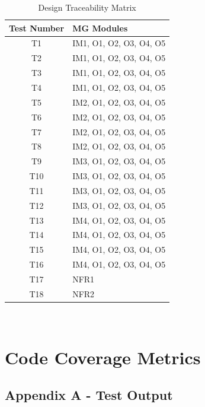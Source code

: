 \documentclass[12pt, titlepage]{article}
\begin{document}
\begin{table} [H]
  \caption{Design Traceability Matrix}
  \label{Table:Table_Traceability_MG}  
\begin{tabular}{|c|p{8cm}|}
  \hline	
  \textbf{Test Number} & \textbf{MG Modules}\\
  \hline 
   T1& IM1, O1, O2, O3, O4, O5\\ \hline
   T2& IM1, O1, O2, O3, O4, O5\\ \hline
   T3& IM1, O1, O2, O3, O4, O5\\ \hline
   T4& IM1, O1, O2, O3, O4, O5\\ \hline
   T5& IM2, O1, O2, O3, O4, O5\\ \hline
   T6& IM2, O1, O2, O3, O4, O5\\ \hline
   T7& IM2, O1, O2, O3, O4, O5\\ \hline
   T8& IM2, O1, O2, O3, O4, O5\\ \hline
   T9& IM3, O1, O2, O3, O4, O5\\ \hline
   T10& IM3, O1, O2, O3, O4, O5\\ \hline
   T11& IM3, O1, O2, O3, O4, O5\\ \hline
   T12& IM3, O1, O2, O3, O4, O5\\ \hline
   T13& IM4, O1, O2, O3, O4, O5\\ \hline
   T14& IM4, O1, O2, O3, O4, O5\\ \hline
   T15& IM4, O1, O2, O3, O4, O5\\ \hline
   T16& IM4, O1, O2, O3, O4, O5\\ \hline
   T17& NFR1\\ \hline
   T18& NFR2\\ \hline

\end{tabular}\\
\end{table}

\section{Code Coverage Metrics} \label{sec_ccm}






\newpage
\begin{landscape}
\section{Appendix A - Test Output} \label{app_a}

\end{landscape}
\end{document}
